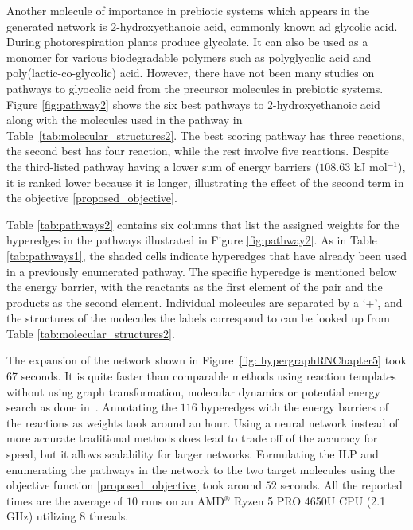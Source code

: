 Another molecule of importance in prebiotic systems which appears in the generated network is 2-hydroxyethanoic acid, commonly known ad glycolic acid. During photorespiration plants produce glycolate. It can also be used as a monomer for various biodegradable polymers such as polyglycolic acid and poly(lactic-co-glycolic) acid. However, there have not been many studies on pathways to glyocolic acid from the precursor molecules in prebiotic systems.  
Figure \ref{fig:pathway2} shows the six best pathways to 2-hydroxyethanoic acid along with the molecules used in the pathway in Table~\ref{tab:molecular_structures2}. The \textcolor{myBlue}{best scoring pathway} has three reactions, the \textcolor{myGreen}{second best} has four reaction, while the rest involve five reactions. Despite the third-listed pathway having a lower sum of energy barriers ($108.63$ kJ mol$^{-1}$), it is ranked lower because it is longer, illustrating the effect of the second term in the objective \eqref{proposed_objective}. 

Table \ref{tab:pathways2} contains six columns that list the assigned weights for the hyperedges in the pathways illustrated in Figure \ref{fig:pathway2}. As in Table \ref{tab:pathways1}, the shaded cells indicate hyperedges that have already been used in a previously enumerated pathway. The specific hyperedge is mentioned below the energy barrier, with the reactants as the first element of the pair and the products as the second element. Individual molecules are separated by a `+', and the structures of the molecules the labels correspond to can be looked up from Table \ref{tab:molecular_structures2}. 

The expansion of the network shown in Figure~\ref{fig: hypergraphRNChapter5} took 67 seconds. It is quite faster than comparable methods using reaction templates without using graph transformation, molecular dynamics or potential energy search as done in~\cite{implemented_CRN}. Annotating the $116$ hyperedges with the energy barriers of the reactions as weights took around an hour. Using a neural network instead of more accurate traditional methods does lead to trade off of the accuracy for speed, but it allows scalability for larger networks. Formulating the ILP and enumerating the pathways in the network to the two target molecules using the objective function \eqref{proposed_objective} took around $52$ seconds. All the reported times are the average of $10$ runs on an AMD$^{\circledR}$ Ryzen 5 PRO 4650U CPU (2.1 GHz) utilizing $8$ threads.


